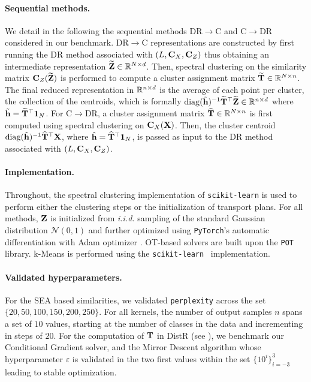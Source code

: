 \paragraph{Sequential methods.} We detail in the following the sequential methods DR$\to$C and C$\to$DR considered in our benchmark. DR$\to$C representations are constructed by first running the DR method associated with $(L, {\mathbf{C}}_X, {\mathbf{C}}_Z)$ thus obtaining an intermediate representation $\widetilde{{\mathbf{Z}}} \in \mathbb{R}^{N \times d}$. Then, spectral clustering \citep{von2007tutorial} on the similarity matrix ${\mathbf{C}}_Z(\widetilde{{\mathbf{Z}}})$ is performed to compute a cluster assignment matrix $\widetilde{{\mathbf{T}}} \in \mathbb{R}^{N \times n}$. The final reduced representation in $\mathbb{R}^{n \times d}$ is the average of each point per cluster, \ie the collection of the centroids, which is formally $\operatorname{diag}(\tilde{{\mathbf{h}}})^{-1} \widetilde{{\mathbf{T}}}^\top \widetilde{{\mathbf{Z}}} \in \mathbb{R}^{n \times d}$ where $\tilde{{\mathbf{h}}} = \widetilde{{\mathbf{T}}}^\top \bm{1}_N$.
For C$\to$DR, a cluster assignment matrix $\widehat{{\mathbf{T}}} \in \mathbb{R}^{N \times n}$ is first computed using spectral clustering on ${\mathbf{C}}_X({\mathbf{X}})$.
Then, the cluster centroid $\operatorname{diag}(\hat{{\mathbf{h}}})^{-1} \widehat{{\mathbf{T}}}^\top {\mathbf{X}}$, where $\hat{{\mathbf{h}}} = \widehat{{\mathbf{T}}}^\top \bm{1}_N$, is passed as input to the DR method associated with $(L, {\mathbf{C}}_X, {\mathbf{C}}_Z)$.

\paragraph{Implementation.} 
Throughout, the spectral clustering implementation of \texttt{scikit-learn} \citep{pedregosa2011scikit} is used to perform either the clustering steps or the initialization of transport plans. 
For all methods, ${\mathbf{Z}}$ is initialized from \emph{i.i.d.} sampling of the standard Gaussian distribution $\mathcal{N}(0,1)$ and further optimized using \texttt{PyTorch}'s automatic differentiation \citep{paszke2017automatic} with Adam optimizer \citep{kingma2014adam}. OT-based solvers are built upon the \texttt{POT} \citep{flamary2021pot} library.
k-Means is performed using the \texttt{scikit-learn}~\citep{pedregosa2011scikit} implementation.

\paragraph{Validated hyperparameters.} For the SEA based similarities, we validated \texttt{perplexity} across the set $\{20, 50, 100, 150, 200, 250\}$. For all kernels, the number of output samples $n$ spans a set of $10$ values, starting at the number of classes in the data and incrementing in steps of $20$. For the computation of ${\mathbf{T}}$ in DistR (see ), we benchmark our Conditional Gradient solver, and the Mirror Descent algorithm whose hyperparameter $\varepsilon$ is validated in the two first values within the set $\{10^{i}\}_{i=-3}^3$ leading to stable optimization.

